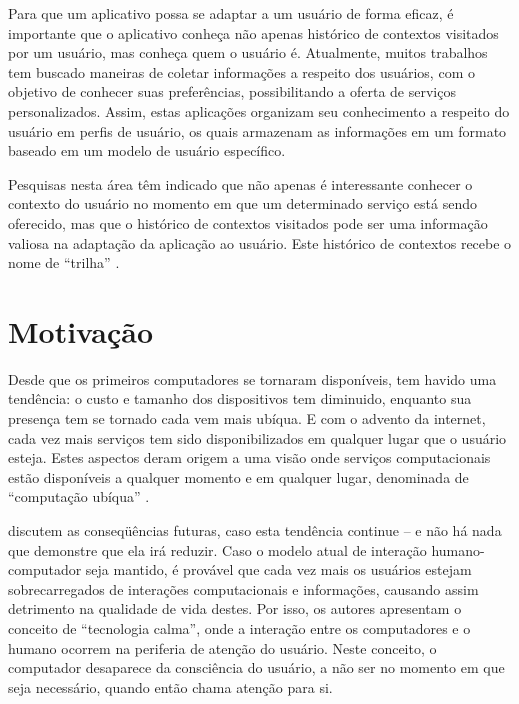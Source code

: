 Para que um aplicativo possa se adaptar a um usuário de forma eficaz, é importante que o aplicativo conheça não apenas histórico de contextos visitados por um usuário, mas conheça quem o usuário é. Atualmente, muitos trabalhos tem buscado maneiras de coletar informações a respeito dos usuários, com o objetivo de conhecer suas preferências, possibilitando a oferta de serviços personalizados. Assim, estas aplicações organizam seu conhecimento a respeito do usuário em perfis de usuário, os quais armazenam as informações em um formato baseado em um modelo de usuário específico. \cite{viviani10}

Pesquisas nesta área têm indicado que não apenas é interessante conhecer o contexto do usuário no momento em que um determinado serviço está sendo oferecido, mas que o histórico de contextos visitados pode ser uma informação valiosa na adaptação da aplicação ao usuário. Este histórico de contextos recebe o nome de ``trilha'' \cite{silva10}.



\section{Motivação}
\label{sec:motivacao}

Desde que os primeiros computadores se tornaram disponíveis, tem havido uma tendência: o custo e tamanho dos dispositivos tem diminuido, enquanto sua presença tem se tornado cada vem mais ubíqua. E com o advento da internet, cada vez mais serviços tem sido disponibilizados em qualquer lugar que o usuário esteja. Estes aspectos deram origem a uma visão onde serviços computacionais estão disponíveis a qualquer momento e em qualquer lugar, denominada de ``computação ubíqua'' \cite{weiser91}.

 discutem as conseqüências futuras, caso esta tendência continue -- e não há nada que demonstre que ela irá reduzir. Caso o modelo atual de interação humano-computador seja mantido, é provável que cada vez mais os usuários estejam sobrecarregados de interações computacionais e informações, causando assim detrimento na qualidade de vida destes. Por isso, os autores apresentam o conceito de ``tecnologia calma'', onde a interação entre os computadores e o humano ocorrem na periferia de atenção do usuário. Neste conceito, o computador desaparece da consciência do usuário, a não ser no momento em que seja necessário, quando então chama atenção para si.

